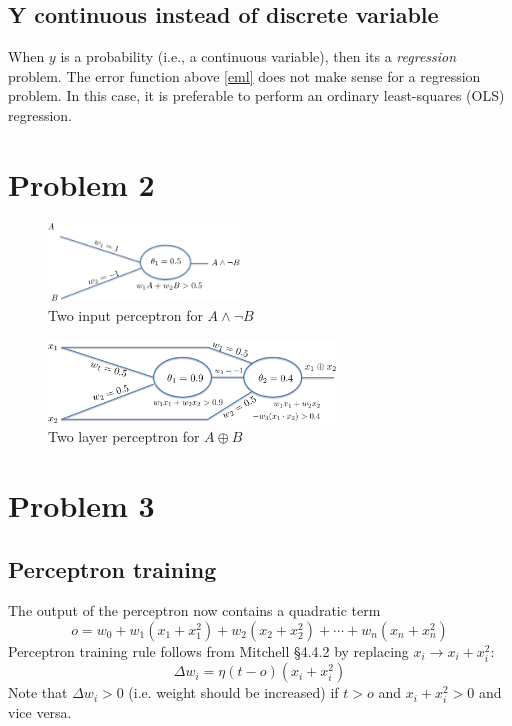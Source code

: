 \documentclass[10pt,letterpaper]{article}
\begin{document}
\subsection{Y continuous instead of discrete variable}
When $y$ is a probability (i.e., a continuous variable), then its a {\em regression} problem. The error function above \eqref{eml} does not make sense for a regression problem. In this case, it is preferable to perform an ordinary least-squares  (OLS) regression. 

\section{Problem 2}
\begin{figure}[!h]
  \includegraphics[width=2in]{./figures/anotb.png}
  \caption{Two input perceptron for $A\wedge\neg B$}
\end{figure}
%
\begin{figure}[!h]
  \includegraphics[width=3in]{./figures/xor.png}
  \caption{Two layer perceptron for $A\oplus B$}
\end{figure}

\section{Problem 3}
\subsection{Perceptron training}
The output of the perceptron now contains a quadratic term
\begin{equation}
  o = w_0 + w_1(x_1 +x_1^2) + w_2(x_2 + x_2^2) + \cdots + w_n(x_n + x_n^2)
\end{equation}
Perceptron training rule follows from Mitchell \S4.4.2 by replacing $x_i \to x_i + x_i^2$:
\begin{equation}
  \boxed{\Delta w_i = \eta (t - o) (x_i + x_i^2)}
\end{equation}
Note that $\Delta w_i > 0$ (i.e. weight should be increased) if $t > o$ and $x_i + x_i^2 > 0$ and vice versa.
\end{document}
